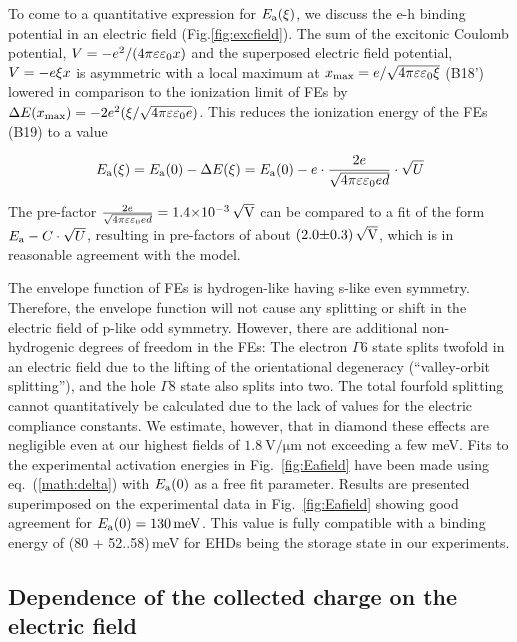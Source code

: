 To come to a quantitative expression for $E_{\textrm{a}}(\xi)$, we discuss the e-h binding potential in an electric field (Fig.\ref{fig:excfield}). 
The sum of the excitonic Coulomb potential, $V = -\mathnormal{e}^2 / (4\pi\varepsilon\varepsilon_0 x)$ and the superposed electric field potential, $V = -\mathnormal{e}\xi x$ is asymmetric
 with a local maximum at $x_{\textrm{max}} = \mathnormal{e} / \sqrt{4\pi\varepsilon\varepsilon_0 \xi}$ {\color{red}(B18')}
 lowered in comparison to the ionization limit of FEs by $\Delta E(x_{\textrm{max}}) = -2\mathnormal{e}^2 ( \xi / \sqrt{4\pi\varepsilon\varepsilon_0 \mathnormal{e}} )$. 
This reduces the ionization energy of the FEs {\color{red}(B19)} to a value 
 
\begin{equation}
 E_{\textrm{a}}(\xi) = E_{\textrm{a}}(0) - \Delta E(\xi) = E_{\textrm{a}}(0) - \mathnormal{e}\cdot \frac{2\mathnormal{e}}{ \sqrt{4\pi\varepsilon\varepsilon_0 \mathnormal{e} d} } \cdot\sqrt{U}
 \label{math:delta}
\end{equation}

\noindent
The pre-factor $\frac{2\mathnormal{e}}{ \sqrt{4\pi\varepsilon\varepsilon_0 \mathnormal{e} d} } = \SI{1.4e-3}{\sqrt{\volt}}$ can be compared to a fit of the form $E_{\textrm{a}} - C\cdot\sqrt{U}$,
 resulting in pre-factors of about $\SI{2.0(3)}{\sqrt{\volt}}$, which is in reasonable agreement with the model. 

The envelope function of FEs is hydrogen-like having s-like even symmetry. 
Therefore, the envelope function will not cause any splitting or shift in the electric field of p-like odd symmetry.
However, there are additional non-hydrogenic degrees of freedom in the FEs:
 The electron $\Gamma6$ state splits twofold  in an electric field due to the lifting of the orientational degeneracy (“valley-orbit splitting”), and the hole $\Gamma8$ state also splits into two. 
The total fourfold splitting cannot quantitatively be calculated due to the lack of values for the electric compliance constants. 
We estimate, however, that in diamond these effects are negligible even at our highest fields of $\SI{1.8}{\volt/\um}$ not exceeding a few meV.
Fits to the experimental activation energies in Fig.~\ref{fig:Eafield} have been made using eq.\ (\ref{math:delta}) with $E_{\textrm{a}}(0)$ as a free fit parameter. 
Results are presented superimposed on the experimental data in Fig.~\ref{fig:Eafield} showing good agreement for $\Ea(0) = \SI{130}{\milli\eV}$. 
This value is fully compatible with a binding energy of (80 + 52..58)\,meV for EHDs being the storage state in our experiments.



\subsection{Dependence of the collected charge on the electric field}

